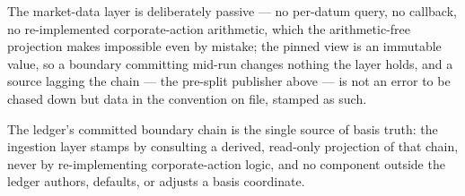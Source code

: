 The market-data layer is deliberately passive --- no per-datum query, no callback,
no re-implemented corporate-action arithmetic, which the arithmetic-free projection
makes impossible even by mistake; the pinned view is an immutable value, so a
boundary committing mid-run changes nothing the layer holds, and a source lagging
the chain --- the pre-split publisher above --- is not an error to be chased down
but data in the convention on file, stamped as such.

\begin{principle}
\label{prin:stamping-authority}
The ledger's committed boundary chain is the single source of basis truth: the
ingestion layer stamps by consulting a derived, read-only projection of that chain,
never by re-implementing corporate-action logic, and no component outside the ledger
authors, defaults, or adjusts a basis coordinate.
\end{principle}

